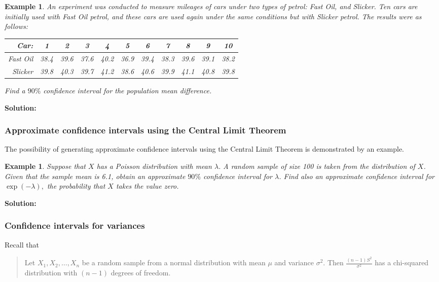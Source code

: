 \documentclass[12pt]{article}
\theoremstyle{break}
\newtheorem{example}[theorem]{Example}
\begin{document}
\begin{example}
An experiment was conducted to measure mileages of cars under two types of petrol: Fast Oil, and Slicker. Ten cars are initially used with Fast Oil petrol, and these cars are used again under the same conditions but with Slicker petrol. The results were as follows:
\begin{center}
\begin{tabular}{|r|c|c|c|c|c|c|c|c|c|c|}
  \hline
  Car: & 1 & 2 & 3 & 4 & 5 & 6 & 7 & 8 & 9 & 10 \\ \hline
  Fast Oil & 38.4 & 39.6 & 37.6 & 40.2 & 36.9 & 39.4 & 38.3 & 39.6 & 39.1 & 38.2 \\
  Slicker  & 39.8 & 40.3 & 39.7 & 41.2 & 38.6 & 40.6 & 39.9 & 41.1 & 40.8 & 39.8 \\
  \hline
\end{tabular}
\end{center}
Find a $90\%$ confidence interval for the population mean difference.
\end{example}
\begin{mdframed}
{\bf Solution:}
\textcolor[rgb]{1.00,1.00,1.00}{\lipsum[1-4]}
\end{mdframed}

\subsubsection{Approximate confidence intervals using the Central Limit Theorem}
The possibility of generating approximate confidence intervals using the Central Limit Theorem is demonstrated by an example.
\begin{example}
Suppose that $X$ has a Poisson distribution with mean $\lambda$. A random sample of size 100 is taken from the distribution of $X$. Given that the sample mean is 6.1, obtain an approximate $90\%$ confidence interval for $\lambda$. Find also an approximate confidence interval for $\exp(-\lambda),$ the probability that $X$ takes the value zero.
\end{example}
\begin{mdframed}
{\bf Solution:}
\textcolor[rgb]{1.00,1.00,1.00}{\lipsum[1-3]}
\end{mdframed}

\subsubsection{Confidence intervals for variances}
Recall that
\begin{quote}
Let $X_{1},X_{2},\ldots,X_{n}$ be a random sample from a normal distribution with mean $\mu$ and variance $\sigma^2$. Then $\displaystyle \frac{(n-1)S^{2}}{\sigma^{2}}$ has a chi-squared distribution with $(n-1)$ degrees of freedom.
\end{quote}
\end{document}
